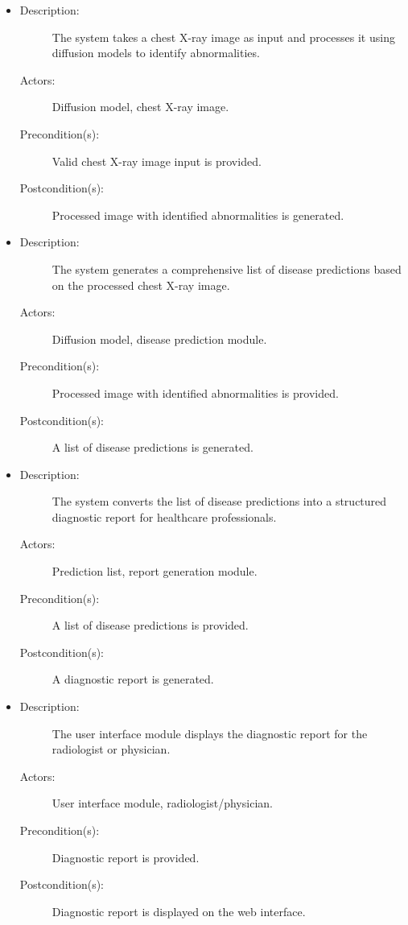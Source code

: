 \documentclass[12pt]{article}
\begin{document}
\begin{itemize}
    \item 
    \begin{description}
        \item[Description:] The system takes a chest X-ray image as input and processes it using diffusion models to identify abnormalities.
        \item[Actors:] Diffusion model, chest X-ray image.
        \item[Precondition(s):] Valid chest X-ray image input is provided.
        \item[Postcondition(s):] Processed image with identified abnormalities is generated.
    \end{description}
    
    \item 
    \begin{description}
        \item[Description:] The system generates a comprehensive list of disease predictions based on the processed chest X-ray image.
        \item[Actors:] Diffusion model, disease prediction module.
        \item[Precondition(s):] Processed image with identified abnormalities is provided.
        \item[Postcondition(s):] A list of disease predictions is generated.
    \end{description}
    
    \item 
    \begin{description}
        \item[Description:] The system converts the list of disease predictions into a structured diagnostic report for healthcare professionals.
        \item[Actors:] Prediction list, report generation module.
        \item[Precondition(s):] A list of disease predictions is provided.
        \item[Postcondition(s):] A diagnostic report is generated.
    \end{description}
    
    \item 
    \begin{description}
        \item[Description:] The user interface module displays the diagnostic report for the radiologist or physician.
        \item[Actors:] User interface module, radiologist/physician.
        \item[Precondition(s):] Diagnostic report is provided.
        \item[Postcondition(s):] Diagnostic report is displayed on the web interface.
    \end{description}
    

\end{itemize}
\end{document}
